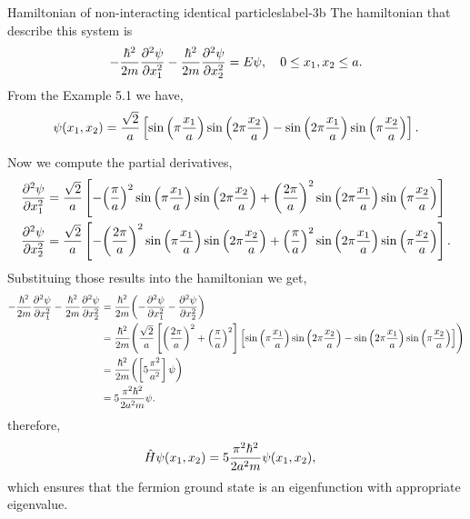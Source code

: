 \documentclass[../main.tex]{subfiles}
\begin{document}
\begin{sol}{Hamiltonian of non-interacting identical particles}{label-3b}
    The hamiltonian that describe this system is 
    \begin{gather*}
        -\frac{\hbar^2}{2m}\pdv[2]{\psi}{x_1}-\frac{\hbar^2}{2m}\pdv[2]{\psi}{x_2} = E\psi,\quad 0\leq x_1,x_2\leq a.
    \end{gather*}
    From the Example 5.1 we have,
    \begin{gather*}
        \psi\qty(x_1,x_2) = \frac{\sqrt{2}}{a}\left[ \sin\qty(\pi\frac{x_1}{a})\sin\qty(2\pi\frac{x_2}{a}) - \sin\qty(2\pi\frac{x_1}{a})\sin\qty(\pi\frac{x_2}{a})\right].
    \end{gather*}

    Now we compute the partial derivatives,
    \begin{align*}
        \pdv[2]{\psi}{x_1} &= \frac{\sqrt{2}}{a}\left[
                                    -\qty(\frac{\pi}{a})^2\sin\qty(\pi\frac{x_1}{a})\sin\qty(2\pi\frac{x_2}{a}) 
                                    + \qty(\frac{2\pi}{a})^2\sin\qty(2\pi\frac{x_1}{a})\sin\qty(\pi\frac{x_2}{a})
                                \right] \\
        \pdv[2]{\psi}{x_2} &= \frac{\sqrt{2}}{a}\left[
                                    -\qty(\frac{2\pi}{a})^2\sin\qty(\pi\frac{x_1}{a})\sin\qty(2\pi\frac{x_2}{a}) 
                                    + \qty(\frac{\pi}{a})^2\sin\qty(2\pi\frac{x_1}{a})\sin\qty(\pi\frac{x_2}{a})
                                \right].
    \end{align*}
    Substituing those results into the hamiltonian we get,
    \begin{align*}
        -\frac{\hbar^2}{2m}\pdv[2]{\psi}{x_1}-\frac{\hbar^2}{2m}\pdv[2]{\psi}{x_2} &= \frac{\hbar^2}{2m}\qty(-\pdv[2]{\psi}{x_1}-\pdv[2]{\psi}{x_2}) \\
                                                                             &= \frac{\hbar^2}{2m}\qty(\frac{\sqrt{2}}{a}\left[\qty(\frac{2\pi}{a})^2+\qty(\frac{\pi}{a})^2\right]\left[\sin\qty(\pi\frac{x_1}{a})\sin\qty(2\pi\frac{x_2}{a}) - \sin\qty(2\pi\frac{x_1}{a})\sin\qty(\pi\frac{x_2}{a})\right]) \\
                                                                             &= \frac{\hbar^2}{2m}\qty(\left[5\frac{\pi^2}{a^2}\right]\psi) \\
                                                                             &= 5\frac{\pi^2\hbar^2}{2a^2m}\psi.
    \end{align*}
    therefore,
    \begin{align*}
        \hat{H}\psi\qty(x_1,x_2)&=5\frac{\pi^2\hbar^2}{2a^2m}\psi\qty(x_1,x_2),
    \end{align*}
    which ensures that the fermion ground state is an eigenfunction with appropriate eigenvalue.


\end{sol}
\end{document}
